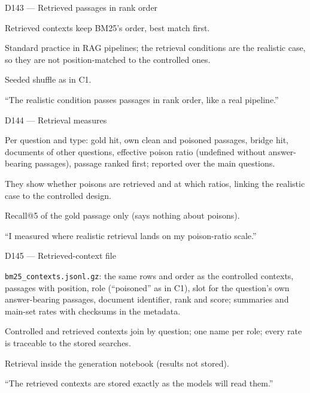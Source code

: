 \documentclass[11pt,a4paper]{report}
\begin{document}
\begin{decisionbox}{D143 --- Retrieved passages in rank order}
\begin{description}[nosep, leftmargin=0pt]
  \item[Decision.] Retrieved contexts keep BM25's order, best match first.
  \item[Why.] Standard practice in RAG pipelines; the retrieval conditions are the realistic case, so they are not position-matched to the controlled ones.
  \item[Alternatives.] Seeded shuffle as in C1.
  \item[Interview line.] ``The realistic condition passes passages in rank order, like a real pipeline.''
\end{description}
\end{decisionbox}

\begin{decisionbox}{D144 --- Retrieval measures}
\begin{description}[nosep, leftmargin=0pt]
  \item[Decision.] Per question and type: gold hit, own clean and poisoned passages, bridge hit, documents of other questions, effective poison ratio (undefined without answer-bearing passages), passage ranked first; reported over the main questions.
  \item[Why.] They show whether poisons are retrieved and at which ratios, linking the realistic case to the controlled design.
  \item[Alternatives.] Recall@5 of the gold passage only (says nothing about poisons).
  \item[Interview line.] ``I measured where realistic retrieval lands on my poison-ratio scale.''
\end{description}
\end{decisionbox}

\begin{decisionbox}{D145 --- Retrieved-context file}
\begin{description}[nosep, leftmargin=0pt]
  \item[Decision.] \texttt{bm25\_contexts.jsonl.gz}: the same rows and order as the controlled contexts, passages with position, role (``poisoned'' as in C1), slot for the question's own answer-bearing passages, document identifier, rank and score; summaries and main-set rates with checksums in the metadata.
  \item[Why.] Controlled and retrieved contexts join by question; one name per role; every rate is traceable to the stored searches.
  \item[Alternatives.] Retrieval inside the generation notebook (results not stored).
  \item[Interview line.] ``The retrieved contexts are stored exactly as the models will read them.''
\end{description}
\end{decisionbox}
\end{document}
